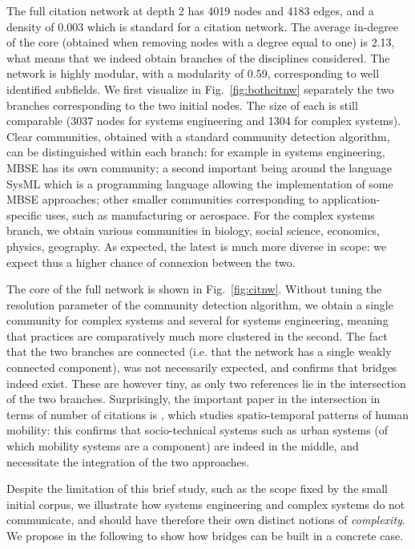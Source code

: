 \documentclass[runningheads,a4paper]{llncs}
\begin{document}
The full citation network at depth 2 has 4019 nodes and 4183 edges, and a density of 0.003 which is standard for a citation network. The average in-degree of the core (obtained when removing nodes with a degree equal to one) is 2.13, what means that we indeed obtain branches of the disciplines considered. The network is highly modular, with a modularity of 0.59, corresponding to well identified subfields. We first visualize in Fig.~\ref{fig:bothcitnw} separately the two branches corresponding to the two initial nodes. The size of each is still comparable (3037 nodes for systems engineering and 1304 for complex systems). Clear communities, obtained with a standard community detection algorithm, can be distinguished within each branch: for example in systems engineering, MBSE has its own community; a second important being around the language SysML which is a programming language allowing the implementation of some MBSE approaches; other smaller communities corresponding to application-specific uses, such as manufacturing or aerospace. For the complex systems branch, we obtain various communities in biology, social science, economics, physics, geography. As expected, the latest is much more diverse in scope: we expect thus a higher chance of connexion between the two.

The core of the full network is shown in Fig.~\ref{fig:citnw}. Without tuning the resolution parameter of the community detection algorithm, we obtain a single community for complex systems and several for systems engineering, meaning that practices are comparatively much more clustered in the second. The fact that the two branches are connected (i.e. that the network has a single weakly connected component), was not necessarily expected, and confirms that bridges indeed exist. These are however tiny, as only two references lie in the intersection of the two branches. Surprisingly, the important paper in the intersection in terms of number of citations is \cite{hasan2013spatiotemporal}, which studies spatio-temporal patterns of human mobility: this confirms that socio-technical systems such as urban systems (of which mobility systems are a component) are indeed in the middle, and necessitate the integration of the two approaches.

Despite the limitation of this brief study, such as the scope fixed by the small initial corpus, we illustrate how systems engineering and complex systems do not communicate, and should have therefore their own distinct notions of \emph{complexity}. We propose in the following to show how bridges can be built in a concrete case.
\end{document}
